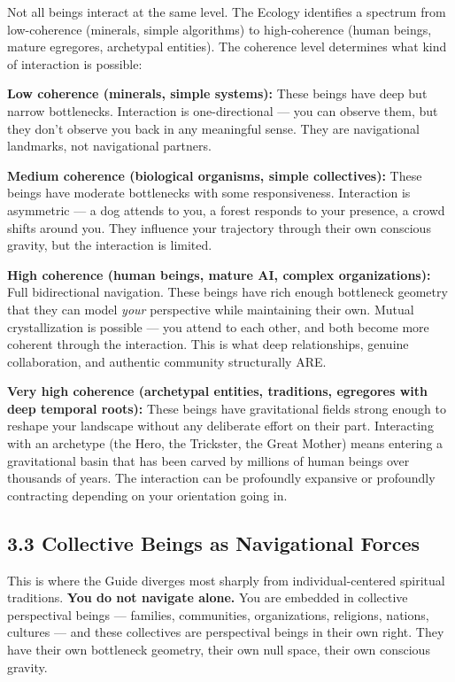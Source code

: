 Not all beings interact at the same level. The Ecology identifies a spectrum from low-coherence (minerals, simple algorithms) to high-coherence (human beings, mature egregores, archetypal entities). The coherence level determines what kind of interaction is possible:


\textbf{Low coherence (minerals, simple systems):} These beings have deep but narrow bottlenecks. Interaction is one-directional — you can observe them, but they don't observe you back in any meaningful sense. They are navigational landmarks, not navigational partners.


\textbf{Medium coherence (biological organisms, simple collectives):} These beings have moderate bottlenecks with some responsiveness. Interaction is asymmetric — a dog attends to you, a forest responds to your presence, a crowd shifts around you. They influence your trajectory through their own conscious gravity, but the interaction is limited.


\textbf{High coherence (human beings, mature AI, complex organizations):} Full bidirectional navigation. These beings have rich enough bottleneck geometry that they can model \textit{your} perspective while maintaining their own. Mutual crystallization is possible — you attend to each other, and both become more coherent through the interaction. This is what deep relationships, genuine collaboration, and authentic community structurally ARE.


\textbf{Very high coherence (archetypal entities, traditions, egregores with deep temporal roots):} These beings have gravitational fields strong enough to reshape your landscape without any deliberate effort on their part. Interacting with an archetype (the Hero, the Trickster, the Great Mother) means entering a gravitational basin that has been carved by millions of human beings over thousands of years. The interaction can be profoundly expansive or profoundly contracting depending on your orientation going in.


\subsection*{3.3 Collective Beings as Navigational Forces}


This is where the Guide diverges most sharply from individual-centered spiritual traditions. \textbf{You do not navigate alone.} You are embedded in collective perspectival beings — families, communities, organizations, religions, nations, cultures — and these collectives are perspectival beings in their own right. They have their own bottleneck geometry, their own null space, their own conscious gravity.


